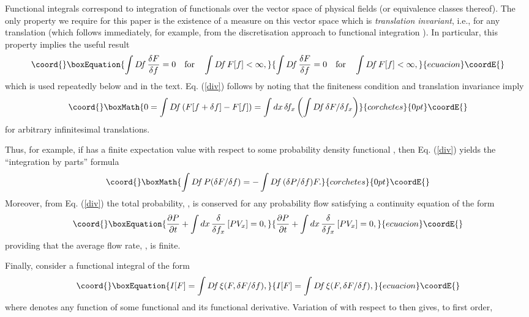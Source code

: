 \documentclass[a4paper,preprint, showpacs, aps, draft]{revtex4}
\begin{document}
{{Functional integrals correspond to integration  of functionals over the
vector space of physical fields (or equivalence classes thereof).  
The only property we require for this paper is the existence of a measure
\coordHE{} on this vector space which is {\it translation invariant}, i.e.,
\coordHE{} for any translation \coordHE{} (which 
follows immediately, for example, from the discretisation approach to
functional integration \cite{brown}). In particular, this 
property implies the useful result 
\begin{equation}\coord{}\boxEquation{ \label{div}
\int D\!f\,\frac{\delta F}{\delta f} = 0~~~{\rm for}~~~\int D\!f\,
F[f] < \infty ,
}{ \int D\!f\,\frac{\delta F}{\delta f} = 0~~~{\rm for}~~~\int D\!f\,
F[f] < \infty ,
}{ecuacion}\coordE{}\end{equation}
which is used repeatedly below and in the text.  Eq. (\ref{div}) follows
by noting that the finiteness condition and translation invariance imply
\[\coord{}\boxMath{ 0 = \int D\!f\, (F[f+\delta f] - F[f]) = \int dx\,\delta\!f_x \left(
\int D\!f\,
\delta F/\delta f_x\right) }{corchetes}{0pt}\coordE{}\]
for arbitrary infinitesimal translations.

Thus, for example, if \coordHE{} has a finite expectation value
with respect to some probability density functional \coordHE{}, then 
Eq. (\ref{div}) yields the ``integration by parts'' formula
\[\coord{}\boxMath{
\int D\!f\,P (\delta F/\delta f) = -\int D\!f\, (\delta P/\delta f)F .}{corchetes}{0pt}\coordE{}\]
Moreover, from Eq. (\ref{div}) the total probability,
\coordHE{},
is conserved for any probability flow satisfying a continuity equation of
the form
\begin{equation}\coord{}\boxEquation{ \label{gcont}
\frac{\partial P}{\partial t} + \int dx\, \frac{\delta}{\delta f_x} \left[ 
PV_x\right] = 0 ,
}{ \frac{\partial P}{\partial t} + \int dx\, \frac{\delta}{\delta f_x} \left[ 
PV_x\right] = 0 ,
}{ecuacion}\coordE{}\end{equation}
providing that the average flow rate, \coordHE{}, is finite. 

Finally, consider a functional integral of the form
\begin{equation}\coord{}\boxEquation{ \label{mdensity}
I[F] = \int D\!f\,\xi(F, \delta F/\delta f) ,
}{ I[F] = \int D\!f\,\xi(F, \delta F/\delta f) ,
}{ecuacion}\coordE{}\end{equation}
where \myHighlight{$\xi$}\coordHE{} denotes any function of some functional \coordHE{} and its functional
derivative.  Variation of \coordHE{} with respect to \coordHE{} then gives, to
first order,

}}
\end{document}
